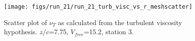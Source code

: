 \begin{figure}[H]
\centering
\texttt{[image: figs/run\_21/run\_21\_turb\_visc\_vs\_r\_meshscatter]}
\caption{Scatter plot of $\nu_T$ as calculated from the turbulent viscosity hypothesis. $z/c$=7.75, $V_{free}$=15.2, station 3.}
\label{fig:run_21_turb_visc_vs_r_meshscatter}
\end{figure}


